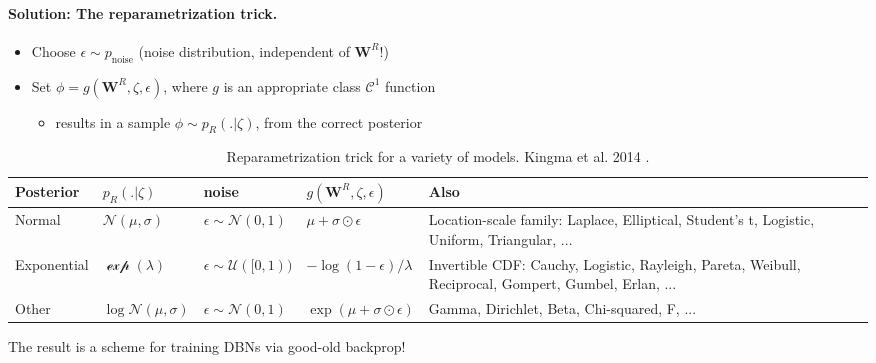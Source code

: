 \documentclass{article} %
\def\W{\mathbf{W}}
\begin{document}
\paragraph{Solution: The reparametrization trick.}
\begin{itemize}
\item Choose $\epsilon \sim p_{\text{noise}}$ (noise distribution, independent of $\W^R$!)
\item Set $\phi = g(\W^{R}, \zeta, \epsilon)$, where $g$ is an appropriate class $\mathcal C^1$ function
  \begin{itemize}
  \item results in a sample $\phi \sim p_R(.|\zeta)$, from the correct
    posterior
    \end{itemize}
\end{itemize}

\begin{table}[H]
  \begin{tabular}{p{1.7cm}|p{1.5cm}|p{1.9cm}|p{2.1cm}|p{5cm}}
         \hline
         Posterior & $p_R(.|\zeta)$ & noise & $g(\W^R,\zeta,\epsilon)$ & Also \\ \hline
         Normal & $\mathcal N(\mu,\sigma)$ & $\epsilon \sim \mathcal N(0, 1)$ & $\mu + \sigma \odot \epsilon$ & Location-scale family: Laplace, Elliptical,
         Student’s t, Logistic, Uniform, Triangular, ... \\ \hline
         Exponential & $\mathcal \exp(\lambda)$ & $\epsilon \sim \mathcal U([0, 1))$ & $-\log(1-\epsilon)/\lambda$ & Invertible CDF: Cauchy, Logistic, Rayleigh, Pareta, Weibull, Reciprocal, Gompert, Gumbel, Erlan, ... \\ \hline
         Other & $\log\mathcal N(\mu,\sigma)$ & $\epsilon \sim \mathcal N(0, 1)$ & $\exp(\mu + \sigma \odot \epsilon)$ & Gamma, Dirichlet, Beta, Chi-squared, F, ... \\ \hline
  \end{tabular}
  \caption{Reparametrization trick for a variety of models. Kingma et al. 2014 \cite{kingma2013auto}.}
\end{table}

The result is a scheme for training DBNs via good-old backprop!

\end{document}
